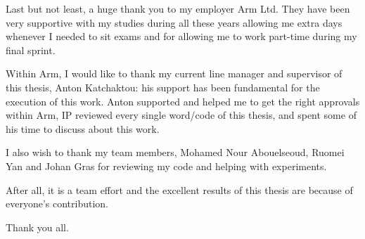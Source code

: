 \medskip

Last but not least, a huge thank you to my employer Arm Ltd. They have been
very supportive with my studies during all these years allowing me extra days
whenever I needed to sit exams and for allowing me to work part-time during my
final sprint.

Within Arm, I would like to thank my current line manager and supervisor of
this thesis, Anton Katchaktou: his support has been fundamental for the
execution of this work. Anton supported and helped me to get the right
approvals within Arm, IP reviewed every single word/code of this thesis, and
spent some of his time to discuss about this work.

I also wish to thank my team members, Mohamed Nour Abouelseoud, Ruomei Yan and
Johan Gras for reviewing my code and helping with experiments.

After all, it is a team effort and the excellent results of this thesis are
because of everyone's contribution.

\medskip

Thank you all.

\clearpage
